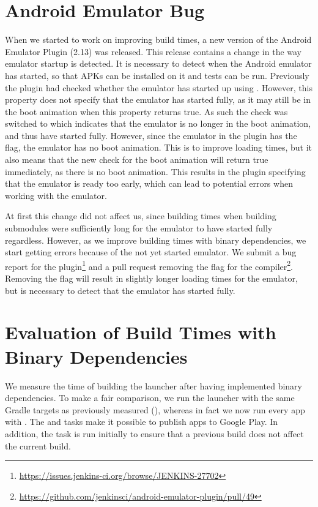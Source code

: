 \section{Android Emulator Bug}\label{sec:emulator_bug}
When we started to work on improving build times, a new version of the Android Emulator Plugin (2.13) was released. This release contains a change in the way emulator startup is detected. It is necessary to detect when the Android emulator has started, so that APKs can be installed on it and tests can be run. Previously the plugin had checked whether the emulator has started up using . However, this property does not specify that the emulator has started fully, as it may still be in the boot animation when this property returns true. As such the check was switched to   which indicates that the emulator is no longer in the boot animation, and thus have started fully. However, since the emulator in the plugin has the  flag, the emulator has no boot animation. This is to improve loading times, but it also means that the new check for the boot animation will return true immediately, as there is no boot animation. This results in the plugin specifying that the emulator is ready too early, which can lead to potential errors when working with the emulator.

At first this change did not affect us, since building times when building submodules were sufficiently long for the emulator to have started fully regardless. However, as we improve building times with binary dependencies, we start getting errors because of the not yet started emulator. We submit a bug report for the plugin\footnote{\url{https://issues.jenkins-ci.org/browse/JENKINS-27702}} and a pull request removing the  flag for the compiler\footnote{\url{https://github.com/jenkinsci/android-emulator-plugin/pull/49}}. Removing the  flag will result in slightly longer loading times for the emulator, but is necessary to detect that the emulator has started fully.

\section{Evaluation of Build Times with Binary Dependencies}\label{sec:faster_build_evaluation}
We measure the time of building the launcher after having implemented binary dependencies. To make a fair comparison, we run the launcher with the same Gradle targets as previously measured (), whereas in fact we now run every app with . The  and  tasks make it possible to publish apps to Google Play. In addition, the  task is run initially to ensure that a previous build does not affect the current build.

